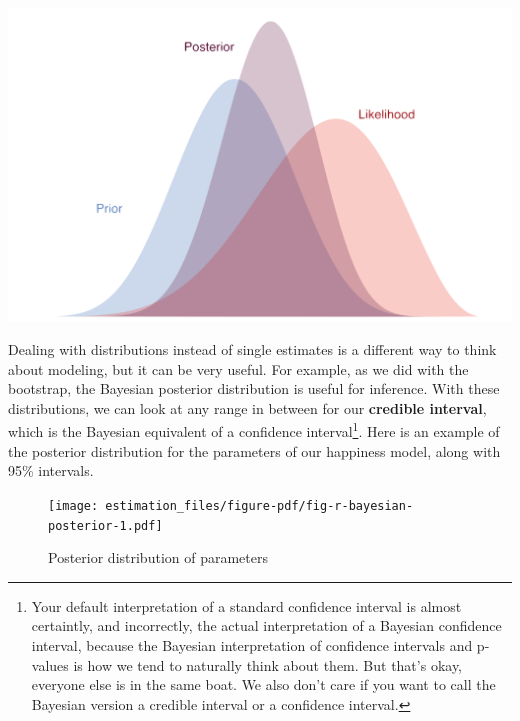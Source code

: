 \documentclass[
  letterpaper,
]{krantz}
\begin{document}
\includegraphics{img/prior2post_clean.png}

Dealing with distributions instead of single estimates is a different
way to think about modeling, but it can be very useful. For example, as
we did with the bootstrap, the Bayesian posterior distribution is useful
for inference. With these distributions, we can look at any range in
between for our \textbf{credible interval}, which is the Bayesian
equivalent of a confidence interval\footnote{Your default interpretation
  of a standard confidence interval is almost certaintly, and
  incorrectly, the actual interpretation of a Bayesian confidence
  interval, because the Bayesian interpretation of confidence intervals
  and p-values is how we tend to naturally think about them. But that's
  okay, everyone else is in the same boat. We also don't care if you
  want to call the Bayesian version a credible interval or a confidence
  interval.}. Here is an example of the posterior distribution for the
parameters of our happiness model, along with 95\% intervals.

\begin{figure}

{\centering \texttt{[image: estimation\_files/figure-pdf/fig-r-bayesian-posterior-1.pdf]}

}

\caption{\label{fig-r-bayesian-posterior}Posterior distribution of
parameters}

\end{figure}
\end{document}
